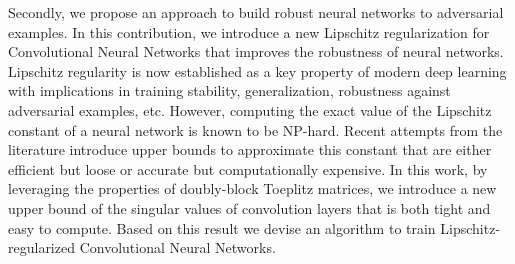 Secondly, we propose an approach to build robust neural networks to adversarial examples.
In this contribution, we introduce a new Lipschitz regularization for Convolutional Neural Networks that improves the robustness of neural networks.
Lipschitz regularity is now established as a key property of modern deep learning with implications in training stability, generalization, robustness against adversarial examples, etc.
However, computing the exact value of the Lipschitz constant of a neural network is known to be NP-hard.
Recent attempts from the literature introduce upper bounds to approximate this constant that are either efficient but loose or accurate but computationally expensive.
In this work, by leveraging the properties of doubly-block Toeplitz matrices, we introduce a new upper bound of the singular values of convolution layers that is both tight and easy to compute.
Based on this result we devise an algorithm to train Lipschitz-regularized Convolutional Neural Networks.



\newpage
\null
\thispagestyle{empty}
\newpage
